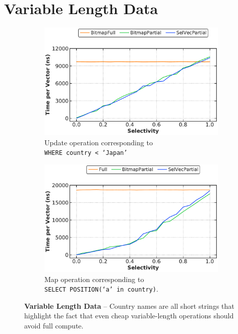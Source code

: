 \documentclass[12pt]{cmuthesis}
\begin{document}
\section{Variable Length Data}
\begin{figure}[t!]
\captionsetup[subfigure]{justification=justified}
\centering
\begin{subfigure}[t]{.49\linewidth}
 \centering
 \includegraphics[width=0.9\linewidth]{eval/simple_string_update.pdf}
 \caption{Update operation corresponding to \\ \texttt{\footnotesize WHERE country < `Japan'}}
  \label{fig:varlen_update}
\end{subfigure}
\begin{subfigure}[t]{.49\linewidth}
 \centering
 \includegraphics[width=0.9\linewidth]{eval/simple_string_map.pdf}
 \caption{Map operation corresponding to \\ \texttt{\footnotesize SELECT POSITION(`a' in country)}.}
  \label{fig:varlen_map}
\end{subfigure}
\caption{\textbf{Variable Length Data} -- Country names are all short strings that highlight the fact that even cheap variable-length operations should avoid full compute.}
\label{fig:varlen_map_update}
\end{figure}
\end{document}
